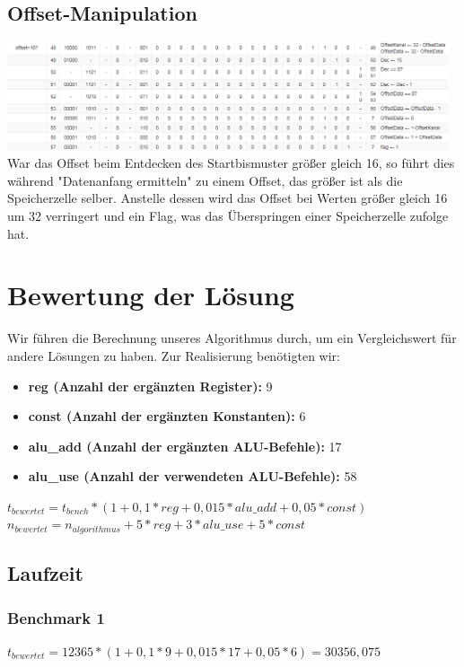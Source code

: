 \documentclass[12pt,titlepage,german,a4]{article}
\begin{document}
    \subsection{Offset-Manipulation}
	\includegraphics[width=13cm]{img/k6.png} \\
    War das Offset beim Entdecken des Startbismuster gr{\"o}{\ss}er gleich 16, so f{\"u}hrt dies w{\"a}hrend "Datenanfang ermitteln" zu einem Offset, das gr{\"o}{\ss}er ist als die Speicherzelle selber. Anstelle dessen wird das Offset bei Werten gr{\"o}{\ss}er gleich 16 um 32 verringert und ein Flag, was das {\"U}berspringen einer Speicherzelle zufolge hat.

    \newpage

    \section{Bewertung der L{\"o}sung}
    Wir f{\"u}hren die Berechnung unseres Algorithmus durch, um ein Vergleichswert f{\"u}r andere L{\"o}sungen zu haben. Zur Realisierung ben{\"o}tigten wir:
    \begin{itemize}
        \item \textbf{reg (Anzahl der erg{\"a}nzten Register):} 9
        \item \textbf{const (Anzahl der erg{\"a}nzten Konstanten):} 6
        \item \textbf{alu{\_}add (Anzahl der erg{\"a}nzten ALU-Befehle):} 17
        \item \textbf{alu{\_}use (Anzahl der verwendeten ALU-Befehle):} 58
    \end{itemize}
	$t_{bewertet} = t_{bench} * (1 + 0,1*reg + 0,015*alu{\_}add + 0,05*const)$ \\
	$n_{bewertet} = n_{algorithmus} + 5* reg + 3*alu{\_}use + 5* const$ \\

    \subsection{Laufzeit}

    \subsubsection{Benchmark 1}
    $t_{bewertet} = 12365 * (1 + 0,1*9 + 0,015*17 + 0,05*6) = 30356,075$
\end{document}
